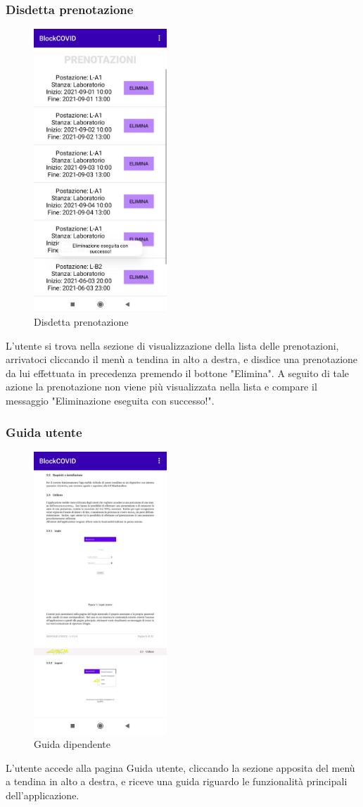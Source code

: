 	\subsubsection{Disdetta prenotazione}
	\begin{figure}[H]
		\centering
		\includegraphics[width=5cm]{res/images/MessaggioEliminazioneAvvenutaSuccesso.png}
		\caption{Disdetta prenotazione}
	\end{figure}
	L’utente si trova nella sezione di visualizzazione della lista delle prenotazioni, arrivatoci cliccando il menù a tendina in alto a destra, e disdice una prenotazione da lui effettuata in precedenza premendo il bottone "Elimina". A seguito di tale azione la prenotazione non viene più visualizzata nella lista e compare il messaggio "Eliminazione eseguita con successo!".
	\subsubsection{Guida utente}
	\begin{figure}[H]
		\centering
		\includegraphics[width=5cm]{res/images/guidaDipendente.png}
		\caption{Guida dipendente}
	\end{figure}
	L’utente accede alla pagina Guida utente, cliccando la sezione apposita del menù a tendina in alto a destra, e riceve una guida riguardo le funzionalità principali dell'applicazione.

